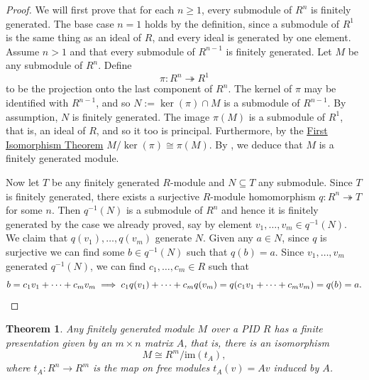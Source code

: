 \documentclass[12pt]{report}
\newtheorem{theorem}{Theorem}[chapter]
\numberwithin{equation}{section}
\numberwithin{theorem}{chapter}
\theoremstyle{definition}
\newtheorem*{basic properties}{Basic Properties}
\newtheorem*{Important Remark}{Important Remark}
\renewcommand{\ker}{\operatorname{ker}}
\begin{document}
\begin{proof}
We will first prove that for each $n \geqslant 1$, every submodule of $R^n$ is finitely generated. The base case $n=1$ holds by the definition, since a submodule of $R^1$ is the same thing as an ideal of $R$, and every ideal is generated by one element.
Assume $n > 1$ and that every submodule of $R^{n-1}$ is finitely generated. Let $M$ be any submodule of $R^n$. Define
$$\pi\!: R^n \twoheadrightarrow R^1$$
to be the projection onto the last component of $R^n$. The kernel of $\pi$ may be identified with $R^{n-1}$, and so $N := \ker(\pi) \cap M$ is a submodule of $R^{n-1}$. By assumption, $N$ is finitely generated. The image $\pi(M)$ is a submodule of $R^1$, that is, an ideal of $R$, and so it too is principal. Furthermore, by the \hyperref[first iso thm]{First Isomorphism Theorem} $M/\ker(\pi)\cong \pi(M)$.
By , we deduce that $M$ is a finitely generated module.


Now let $T$ be any finitely generated $R$-module and $N \subseteq T$ any submodule. Since $T$ is finitely generated, there exists a surjective $R$-module homomorphism $q\!: R^n \twoheadrightarrow T$ for some $n$. Then $q^{-1}(N)$ is a submodule of $R^n$ and hence it is finitely generated by the case we already proved, say by element $v_1, \dots , v_m \in q^{-1}(N)$. We claim that $q(v_1), \dots, q(v_m)$ generate $N$. Given any $a \in N$, since $q$ is surjective we can find some $b \in q^{-1}(N)$ such that $q(b) = a$. Since $v_1, \ldots, v_m$ generated $q^{-1}(N)$, we can find $c_1, \ldots, c_m \in R$ such that
$$b = c_1 v_1 + \cdots + c_m v_m \implies c_1 q(v_1) + \cdots + c_m q(v_m) = q(c_1 v_1 + \cdots + c_m v_m) = q(b) = a.\qedhere$$ 
\end{proof}






\begin{theorem}\label{presentations}
Any finitely generated module $M$ over a PID $R$ has a finite presentation given by an $m \times n$ matrix $A$, that is, there is an isomorphism
$$M\cong R^m/\mathrm{im}(t_A),$$
where $t_A\!: R^n \to R^m$ is the map on free modules $t_A(v)=Av$ induced by $A$.
\end{theorem}
\end{document}
